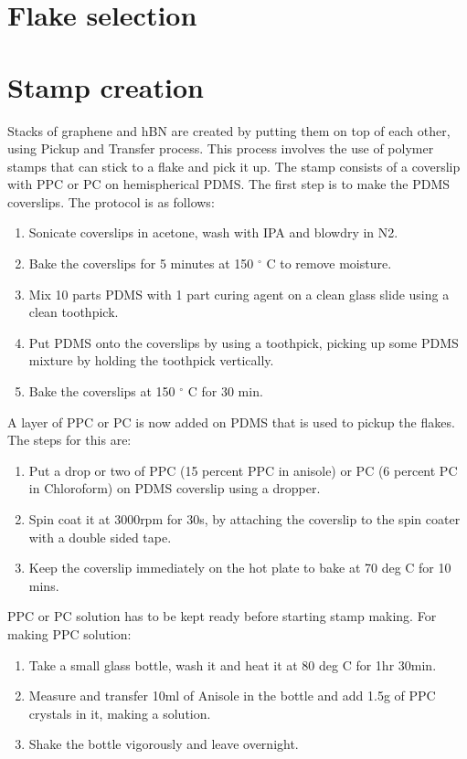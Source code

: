 \section{Flake selection}
\section{Stamp creation}

Stacks of graphene and hBN are created by putting them on top of each other, using Pickup and Transfer process. This process involves the use of polymer stamps that can stick to a flake and pick it up. The stamp consists of a coverslip with PPC or PC on hemispherical PDMS. The first step is to make the PDMS coverslips. The protocol is as follows:
\begin{enumerate}
\item Sonicate coverslips in acetone, wash with IPA and blowdry in N2.
\item Bake the coverslips for 5 minutes at 150 $^{\circ}$ C to remove moisture.
\item Mix 10 parts PDMS with 1 part curing agent on a clean glass slide using a clean toothpick.
\item Put PDMS onto the coverslips by using a toothpick, picking up some PDMS mixture by holding the toothpick vertically.
\item Bake the coverslips at 150 $^{\circ}$ C for 30 min.
\end{enumerate}
A layer of PPC or PC is now added on PDMS that is used to pickup the flakes. The steps for this are:
\begin{enumerate}
\item Put a drop or two of PPC (15 percent PPC in anisole) or PC (6 percent PC in Chloroform) on PDMS coverslip using a dropper.
\item Spin coat it at 3000rpm for 30s, by attaching the coverslip to the spin coater with a double sided tape.
\item Keep the coverslip immediately on the hot plate to bake at 70 deg C for 10 mins.
\end{enumerate}
PPC or PC solution has to be kept ready before starting stamp making. For making PPC solution: 
\begin{enumerate}
\item Take a small glass bottle, wash it and heat it at 80 deg C for 1hr 30min. \item Measure and transfer 10ml of Anisole in the bottle and add 1.5g of PPC crystals in it, making a solution.
\item Shake the bottle vigorously and leave overnight.
\end{enumerate}
